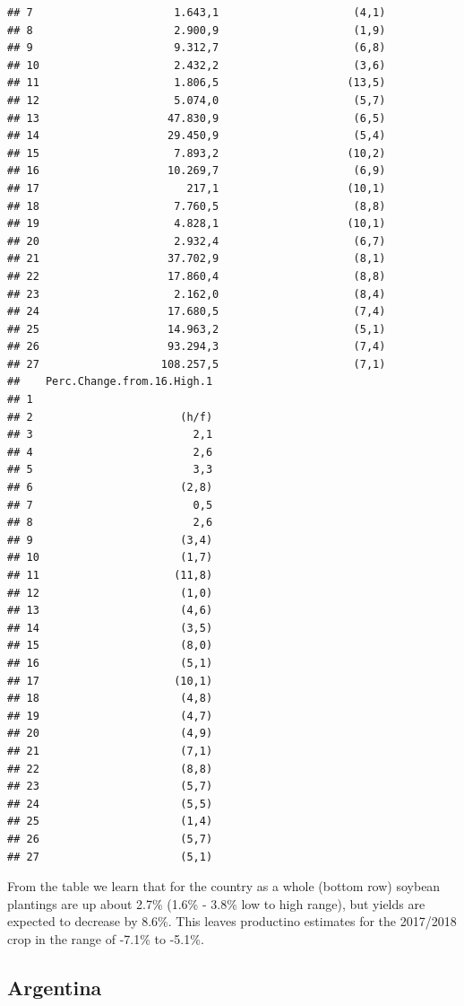 \documentclass[
]{book}
\begin{document}
\begin{verbatim}
## 7                      1.643,1                     (4,1)
## 8                      2.900,9                     (1,9)
## 9                      9.312,7                     (6,8)
## 10                     2.432,2                     (3,6)
## 11                     1.806,5                    (13,5)
## 12                     5.074,0                     (5,7)
## 13                    47.830,9                     (6,5)
## 14                    29.450,9                     (5,4)
## 15                     7.893,2                    (10,2)
## 16                    10.269,7                     (6,9)
## 17                       217,1                    (10,1)
## 18                     7.760,5                     (8,8)
## 19                     4.828,1                    (10,1)
## 20                     2.932,4                     (6,7)
## 21                    37.702,9                     (8,1)
## 22                    17.860,4                     (8,8)
## 23                     2.162,0                     (8,4)
## 24                    17.680,5                     (7,4)
## 25                    14.963,2                     (5,1)
## 26                    93.294,3                     (7,4)
## 27                   108.257,5                     (7,1)
##    Perc.Change.from.16.High.1
## 1                            
## 2                       (h/f)
## 3                         2,1
## 4                         2,6
## 5                         3,3
## 6                       (2,8)
## 7                         0,5
## 8                         2,6
## 9                       (3,4)
## 10                      (1,7)
## 11                     (11,8)
## 12                      (1,0)
## 13                      (4,6)
## 14                      (3,5)
## 15                      (8,0)
## 16                      (5,1)
## 17                     (10,1)
## 18                      (4,8)
## 19                      (4,7)
## 20                      (4,9)
## 21                      (7,1)
## 22                      (8,8)
## 23                      (5,7)
## 24                      (5,5)
## 25                      (1,4)
## 26                      (5,7)
## 27                      (5,1)
\end{verbatim}

From the table we learn that for the country as a whole (bottom row) soybean plantings are up about 2.7\% (1.6\% - 3.8\% low to high range), but yields are expected to decrease by 8.6\%. This leaves productino estimates for the 2017/2018 crop in the range of -7.1\% to -5.1\%.

\hypertarget{argentina}{%
\subsection{Argentina}\label{argentina}}
\end{document}
